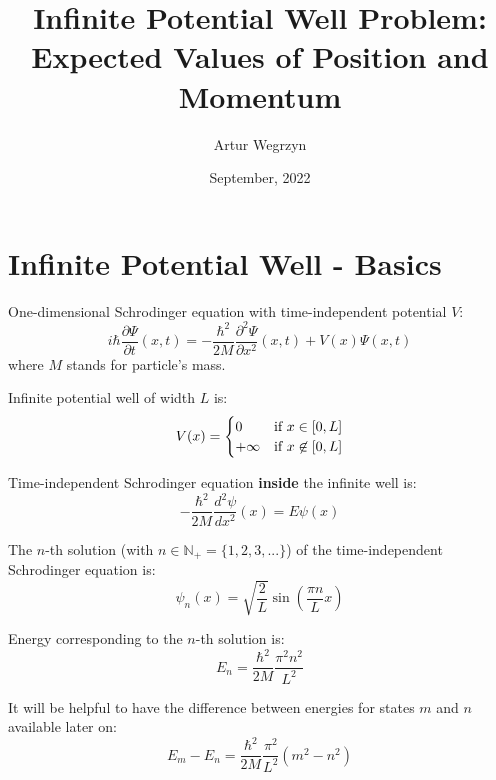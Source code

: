 \documentclass[12pt]{article}
\begin{document}
\title{Infinite Potential Well Problem: Expected Values of Position and Momentum}
\author{Artur Wegrzyn}
\date{September, 2022}
\maketitle



\tableofcontents

\newpage

\section{Infinite Potential Well - Basics}
One-dimensional Schrodinger equation with time-independent potential $V$:
\begin{equation}
i \hbar \frac{\partial \Psi}{\partial t}(x,t) = - \frac{\hbar^2}{2M} \frac{\partial^2 \Psi}{\partial x^2}(x,t) + V(x) \Psi(x, t)
\end{equation}
where $M$ stands for particle's mass.

Infinite potential well of width $L$ is:
\begin{equation*}
V(x) =
\begin{cases} 
0 & \text{if $ x\in [0, L] $} \\ 
+\infty & \text{if $ x \not\in [0, L] $}
\end{cases}
\end{equation*}

Time-independent Schrodinger equation \textbf{inside} the infinite well is:
\begin{equation*}
- \frac{\hbar^2}{2M} \frac{d^2 \psi}{ d x^2}(x) = E \psi(x)
\end{equation*}

The $n$-th solution (with $n \in \mathbb{N}_{+}=\{1, 2, 3, ... \}$) of the time-independent Schrodinger equation is:
\begin{equation}
\label{stationary_solution}
\psi_n(x) = \sqrt{\frac{2}{L}} \sin \left( \frac{\pi n}{L}x \right)
\end{equation}

\noindent Energy corresponding to the $n$-th solution is:
\begin{equation}
E_n = \frac{\hbar^2}{2M} \frac{\pi^2 n^2}{L^2}
\end{equation}

\noindent It will be helpful to have the difference between energies for states $m$ and $n$ available later on:
\begin{equation}
E_m - E_n = \frac{\hbar^2}{2M} \frac{\pi^2}{L^2} (m^2 - n^2)
\end{equation}
\end{document}
